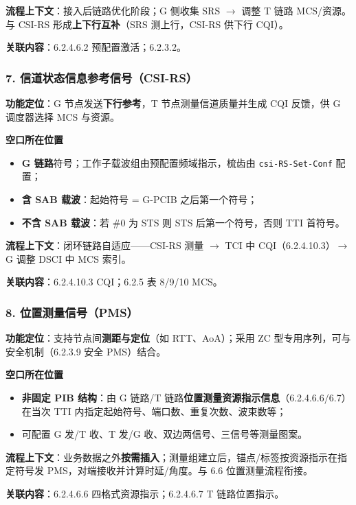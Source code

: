\documentclass[11pt,a4paper]{ctexart}
\begin{document}
\textbf{流程上下文}：接入后链路优化阶段；G 侧收集 SRS $\rightarrow$ 调整 T 链路 MCS/资源。与 CSI-RS 形成\textbf{上下行互补}（SRS 测上行，CSI-RS 供下行 CQI）。

\textbf{关联内容}：6.2.4.6.2 预配置激活；6.2.3.2。

\subsubsection{7. 信道状态信息参考信号（CSI-RS）}

\textbf{功能定位}：G 节点发送\textbf{下行参考}，T 节点测量信道质量并生成 CQI 反馈，供 G 调度器选择 MCS 与资源。

\textbf{空口所在位置}
\begin{itemize}[nosep]
  \item \textbf{G 链路}符号；工作子载波组由预配置频域指示，梳齿由 \texttt{csi-RS-Set-Conf} 配置；
  \item \textbf{含 SAB 载波}：起始符号 = G-PCIB 之后第一个符号；
  \item \textbf{不含 SAB 载波}：若 \#0 为 STS 则 STS 后第一个符号，否则 TTI 首符号。
\end{itemize}

\textbf{流程上下文}：闭环链路自适应——CSI-RS 测量 $\rightarrow$ TCI 中 CQI（6.2.4.10.3）$\rightarrow$ G 调整 DSCI 中 MCS 索引。

\textbf{关联内容}：6.2.4.10.3 CQI；6.2.5 表 8/9/10 MCS。

\subsubsection{8. 位置测量信号（PMS）}

\textbf{功能定位}：支持节点间\textbf{测距与定位}（如 RTT、AoA）；采用 ZC 型专用序列，可与安全机制（6.2.3.9 安全 PMS）结合。

\textbf{空口所在位置}
\begin{itemize}[nosep]
  \item \textbf{非固定 PIB 结构}：由 G 链路/T 链路\textbf{位置测量资源指示信息}（6.2.4.6.6/6.7）在当次 TTI 内指定起始符号、端口数、重复次数、波束数等；
  \item 可配置 G 发/T 收、T 发/G 收、双边两信号、三信号等测量图案。
\end{itemize}

\textbf{流程上下文}：业务数据之外\textbf{按需插入}；测量组建立后，锚点/标签按资源指示在指定符号发 PMS，对端接收并计算时延/角度。与 6.6 位置测量流程衔接。

\textbf{关联内容}：6.2.4.6.6 四格式资源指示；6.2.4.6.7 T 链路位置指示。
\end{document}
